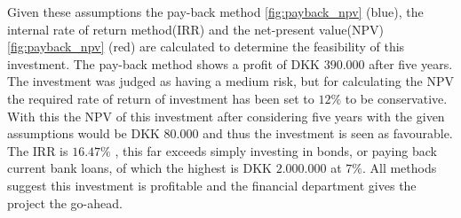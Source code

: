Given these assumptions the pay-back method \ref{fig:payback_npv} (blue), the internal rate of return method(IRR) and the net-present value(NPV) \ref{fig:payback_npv} (red) are calculated to determine the feasibility of this investment.
The pay-back method shows a profit of DKK $390.000$ after five years. The investment was judged as having a medium risk, but for calculating the NPV the required rate of return of investment has been set to $12\%$ to be conservative. With this the NPV of this investment after considering five years with the given assumptions would be DKK $80.000$ and thus the investment is seen as favourable. The IRR is $16.47\%$ , this far exceeds simply investing in bonds, or paying back current bank loans, of which the highest is DKK $2.000.000$ at $7\%$.
All methods suggest this investment is profitable and the financial department gives the project the go-ahead.

